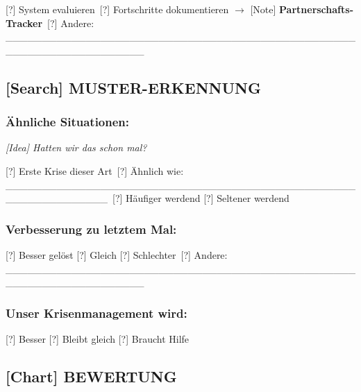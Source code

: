 [?] System evaluieren\
[?] Fortschritte dokumentieren $\rightarrow$ [Note] \textbf{Partnerschafts-Tracker}\
[?] Andere: \_\_\_\_\_\_\_\_\_\_\_\_\_\_\_\_\_\_\_\_\_\_\_\_\_\_\_\_\_\_\_\_\_\_\_\_\_\_\_\_\_\_\_\_\_\_\_\_\_\_\_\_\_\_\_\_\_\_\_\_\_\_\_\_\_\_\_

\hypertarget{muster-erkennung}{%
\subsection{\texorpdfstring{\textbf{[Search] MUSTER-ERKENNUNG}}{[Search] MUSTER-ERKENNUNG}}\label{muster-erkennung}}

\hypertarget{uxe4hnliche-situationen}{%
\subsubsection{\texorpdfstring{\textbf{Ähnliche Situationen:}}{Ähnliche Situationen:}}\label{uxe4hnliche-situationen}}

\emph{[Idea] Hatten wir das schon mal?}

[?] Erste Krise dieser Art\
[?] Ähnlich wie: \_\_\_\_\_\_\_\_\_\_\_\_\_\_\_\_\_\_\_\_\_\_\_\_\_\_\_\_\_\_\_\_\_\_\_\_\_\_\_\_\_\_\_\_\_\_\_\_\_\_\_\_\_\_\_\_\_\_\_\_\_\_\
[?] Häufiger werdend [?] Seltener werdend

\hypertarget{verbesserung-zu-letztem-mal}{%
\subsubsection{\texorpdfstring{\textbf{Verbesserung zu letztem Mal:}}{Verbesserung zu letztem Mal:}}\label{verbesserung-zu-letztem-mal}}

[?] Besser gelöst [?] Gleich [?] Schlechter\
[?] Andere: \_\_\_\_\_\_\_\_\_\_\_\_\_\_\_\_\_\_\_\_\_\_\_\_\_\_\_\_\_\_\_\_\_\_\_\_\_\_\_\_\_\_\_\_\_\_\_\_\_\_\_\_\_\_\_\_\_\_\_\_\_\_\_\_\_\_\_

\hypertarget{unser-krisenmanagement-wird}{%
\subsubsection{\texorpdfstring{\textbf{Unser Krisenmanagement wird:}}{Unser Krisenmanagement wird:}}\label{unser-krisenmanagement-wird}}

[?] Besser [?] Bleibt gleich [?] Braucht Hilfe

\hypertarget{bewertung}{%
\subsection{\texorpdfstring{\textbf{[Chart] BEWERTUNG}}{[Chart] BEWERTUNG}}\label{bewertung}}


